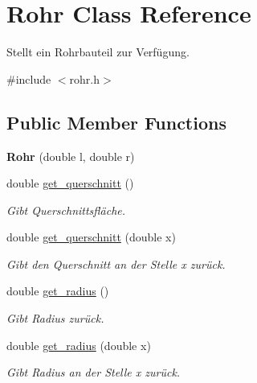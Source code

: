 \hypertarget{class_rohr}{}\section{Rohr Class Reference}
\label{class_rohr}


Stellt ein Rohrbauteil zur Verfügung.  




{\ttfamily \#include $<$rohr.\+h$>$}

\subsection*{Public Member Functions}
\begin{DoxyCompactItemize}
\item 
\mbox{\label{class_rohr_a8548148de26323a876077bfb61324ed3}} 
{\bfseries Rohr} (double l, double r)
\item 
\mbox{\label{class_rohr_a6763a65cfe3992b6dd4baa903ae44b29}} 
double \hyperlink{class_rohr_a6763a65cfe3992b6dd4baa903ae44b29}{get\+\_\+querschnitt} ()
\begin{DoxyCompactList}\small\item\em Gibt Querschnittsfläche. \end{DoxyCompactList}\item 
double \hyperlink{class_rohr_ab8c1e474c5b1510a7c52cb805260ab15}{get\+\_\+querschnitt} (double x)
\begin{DoxyCompactList}\small\item\em Gibt den Querschnitt an der Stelle x zurück. \end{DoxyCompactList}\item 
\mbox{\label{class_rohr_a273b05707337661cfaab228a670350f2}} 
double \hyperlink{class_rohr_a273b05707337661cfaab228a670350f2}{get\+\_\+radius} ()
\begin{DoxyCompactList}\small\item\em Gibt Radius zurück. \end{DoxyCompactList}\item 
double \hyperlink{class_rohr_a427e4ad6d350912715bd6796e385eaf3}{get\+\_\+radius} (double x)
\begin{DoxyCompactList}\small\item\em Gibt Radius an der Stelle x zurück. \end{DoxyCompactList}\item 

\end{DoxyCompactItemize}
